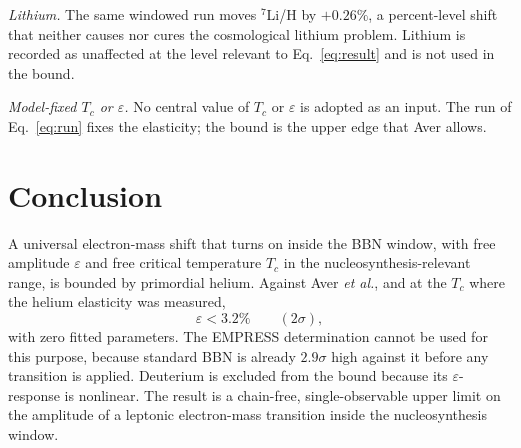\documentclass[aps,prd,twocolumn,superscriptaddress,nofootinbib,10pt]{revtex4-2}
\begin{document}
\emph{Lithium.} The same windowed run moves $^7$Li/H by $+0.26\%$, a percent-level shift that
neither causes nor cures the cosmological lithium problem. Lithium is recorded as unaffected at
the level relevant to Eq.~\eqref{eq:result} and is not used in the bound.

\emph{Model-fixed $T_c$ or $\varepsilon$.} No central value of $T_c$ or $\varepsilon$ is adopted
as an input. The run of Eq.~\eqref{eq:run} fixes the elasticity; the bound is the upper edge that
Aver allows.

\section{Conclusion}\label{sec:conclude}

A universal electron-mass shift that turns on inside the BBN window, with free amplitude
$\varepsilon$ and free critical temperature $T_c$ in the nucleosynthesis-relevant range, is
bounded by primordial helium. Against Aver \emph{et al.}, and at the $T_c$ where the helium
elasticity was measured,
%
\begin{equation*}
  \varepsilon < 3.2\% \qquad (2\sigma),
\end{equation*}
%
with zero fitted parameters. The EMPRESS determination cannot be used for this purpose, because
standard BBN is already $2.9\sigma$ high against it before any transition is applied. Deuterium
is excluded from the bound because its $\varepsilon$-response is nonlinear. The result is a
chain-free, single-observable upper limit on the amplitude of a leptonic electron-mass transition
inside the nucleosynthesis window.
\end{document}
